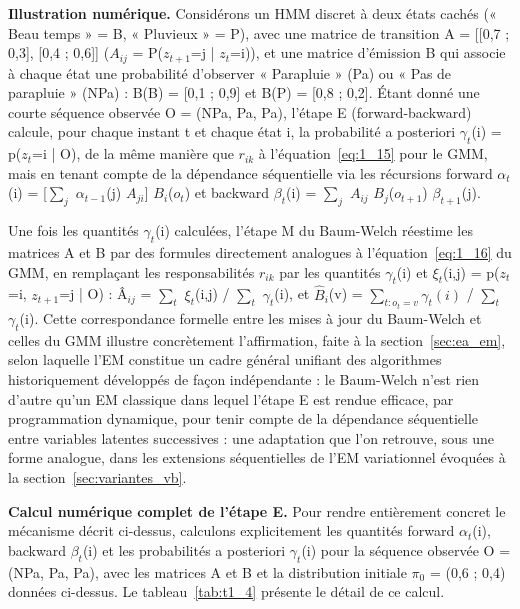 \textbf{Illustration numérique. }Considérons un HMM discret à deux états cachés (« Beau temps » = B, « Pluvieux » = P), avec une matrice de transition A = [[0,7 ; 0,3], [0,4 ; 0,6]] ($A_{ij}$ = P($z_{t+1}$=j | $z_{t}$=i)), et une matrice d'émission B qui associe à chaque état une probabilité d'observer « Parapluie » (Pa) ou « Pas de parapluie » (NPa) : B(B) = [0,1 ; 0,9] et B(P) = [0,8 ; 0,2]. Étant donné une courte séquence observée O = (NPa, Pa, Pa), l'étape E (forward-backward) calcule, pour chaque instant t et chaque état i, la probabilité a posteriori $\gamma _{t}$(i) = p($z_{t}$=i | O), de la même manière que $r_{ik}$ à l'équation~\eqref{eq:1_15} pour le GMM, mais en tenant compte de la dépendance séquentielle via les récursions forward $\alpha _{t}$(i) = [$\sum_{j}$ $\alpha _{t-1}$(j) $A_{ji}$] $B_{i}$($o_{t}$) et backward $\beta _{t}$(i) = $\sum_{j}$ $A_{ij}$ $B_{j}$($o_{t+1}$) $\beta _{t+1}$(j).

Une fois les quantités $\gamma _{t}$(i) calculées, l'étape M du Baum-Welch réestime les matrices A et B par des formules directement analogues à l'équation~\eqref{eq:1_16} du GMM, en remplaçant les responsabilités $r_{ik}$ par les quantités $\gamma _{t}$(i) et $\xi _{t}$(i,j) = p($z_{t}$=i, $z_{t+1}$=j | O) : Â$_{ij}$ = $\sum_{t}$ $\xi _{t}$(i,j) / $\sum_{t}$ $\gamma _{t}$(i), et $\hat{B}$$_{i}$(v) = $\sum_{t : o_{t} = v} \gamma_{t}(i)$ / $\sum_{t}$ $\gamma _{t}$(i). Cette correspondance formelle entre les mises à jour du Baum-Welch et celles du GMM illustre concrètement l'affirmation, faite à la section~\ref{sec:ea_em}, selon laquelle l'EM constitue un cadre général unifiant des algorithmes historiquement développés de façon indépendante : le Baum-Welch n'est rien d'autre qu'un EM classique dans lequel l'étape E est rendue efficace, par programmation dynamique, pour tenir compte de la dépendance séquentielle entre variables latentes successives : une adaptation que l'on retrouve, sous une forme analogue, dans les extensions séquentielles de l'EM variationnel évoquées à la section~\ref{sec:variantes_vb}.

\textbf{Calcul numérique complet de l'étape E. }Pour rendre entièrement concret le mécanisme décrit ci-dessus, calculons explicitement les quantités forward $\alpha _{t}$(i), backward $\beta _{t}$(i) et les probabilités a posteriori $\gamma _{t}$(i) pour la séquence observée O = (NPa, Pa, Pa), avec les matrices A et B et la distribution initiale $\pi _{0}$ = (0,6 ; 0,4) données ci-dessus. Le tableau~\ref{tab:t1_4} présente le détail de ce calcul.

